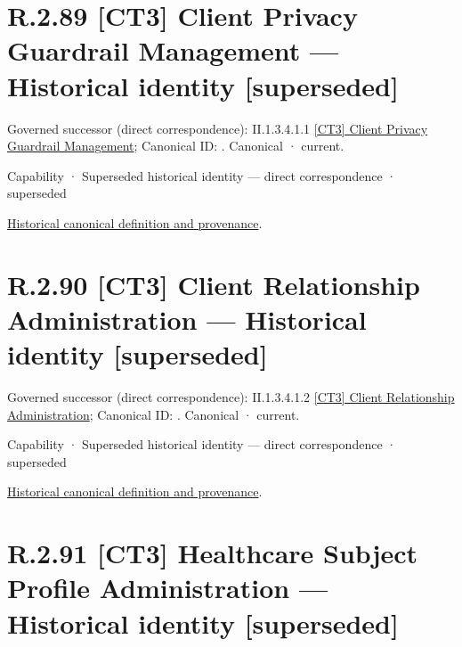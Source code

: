 \section*{R.2.89 [CT3] Client Privacy Guardrail Management — Historical identity [superseded]}
\label{navigation:R.2.89}

{\small Governed successor (direct correspondence): II.1.3.4.1.1 \hyperref[element:7577a6e1815243648dd5356c21cca151]{[CT3] Client Privacy Guardrail Management}; Canonical ID: \texttt{}. Canonical · current.}\par
\label{element:d2e6078b5db041cb904e0cadcebce6eb}
{\small Capability · Superseded historical identity — direct correspondence · superseded}\par
\href{../../../../../../../continuum/strategy/capability/d2e6078b5db041cb904e0cadcebce6eb.md}{Historical canonical definition and provenance}.\par
\section*{R.2.90 [CT3] Client Relationship Administration — Historical identity [superseded]}
\label{navigation:R.2.90}

{\small Governed successor (direct correspondence): II.1.3.4.1.2 \hyperref[element:d682c11d3eb04770b1f20be478fd475e]{[CT3] Client Relationship Administration}; Canonical ID: \texttt{}. Canonical · current.}\par
\label{element:2c799ec0c4c74c97a75c12e949887b95}
{\small Capability · Superseded historical identity — direct correspondence · superseded}\par
\href{../../../../../../../continuum/strategy/capability/2c799ec0c4c74c97a75c12e949887b95.md}{Historical canonical definition and provenance}.\par
\section*{R.2.91 [CT3] Healthcare Subject Profile Administration — Historical identity [superseded]}
\label{navigation:R.2.91}

